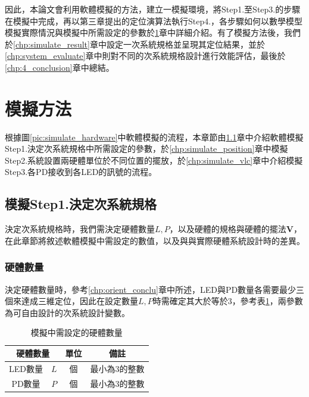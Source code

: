 因此，本論文會利用軟體模擬的方法，建立一模擬環境，將Step1.至Step3.的步驟在模擬中完成，再以第三章提出的定位演算法執行Step4.，各步驟如何以數學模型模擬實際情況與模擬中所需設定的參數於\ref{chp:simulation}章中詳細介紹。有了模擬方法後，我們於\ref{chp:simulate_result}章中設定一次系統規格並呈現其定位結果，並於\ref{chp:system_evaluate}章中則對不同的次系統規格設計進行效能評估，最後於\ref{chp:4_conclusion}章中總結。


\section{模擬方法}
\label{chp:simulation}

根據圖\ref{pic:simulate_hardware}中軟體模擬的流程，本章節由\ref{chp:system_design}章中介紹軟體模擬Step1.決定次系統規格中所需設定的參數，於\ref{chp:simulate_position}章中模擬Step2.系統設置兩硬體單位於不同位置的擺放，於\ref{chp:simulate_vlc}章中介紹模擬Step3.各PD接收到各LED的訊號的流程。




\subsection{模擬Step1.決定次系統規格}
\label{chp:system_design}

決定次系統規格時，我們需決定硬體數量$L,P$，以及硬體的規格與硬體的擺法$\boldsymbol{V}$，在此章節將敘述軟體模擬中需設定的數值，以及與與實際硬體系統設計時的差異。

\subsubsection{硬體數量}

決定硬體數量時，參考\ref{chp:orient_conclu}章中所述，LED與PD數量各需要最少三個來達成三維定位，因此在設定數量$L,P$時需確定其大於等於3，參考表\ref{tab:para_amount}，兩參數為可自由設計的次系統設計變數。

\begin{table}[htpb]
    \renewcommand{\arraystretch}{1.3}
    \setlength{\arrayrulewidth}{0.15mm}
    \setlength{\doublerulesep}{0.12mm}
    \caption{模擬中需設定的硬體數量}
    \label{tab:para_amount}
    \centering
    \begin{tabular}{|cc|c|c|}
    \hline
    \multicolumn{2}{|c|}{\textbf{硬體數量}}  &\textbf{單位}  &  \textbf{備註}   \\
    \hline
     LED數量 &$L$ & 個 & 最小為3的整數 \\\hline
      PD數量& $P$& 個  & 最小為3的整數 \\\hline
    \end{tabular}
\end{table}
    
